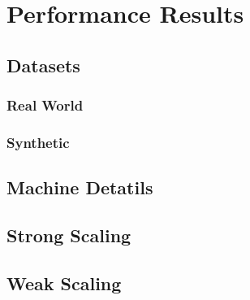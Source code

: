 \section{Performance Results} \label{sec:experiments}

\subsection{Datasets}

\subsubsection{Real World}
\subsubsection{Synthetic}

\subsection{Machine Detatils}

\subsection{Strong Scaling}

\subsection{Weak Scaling}